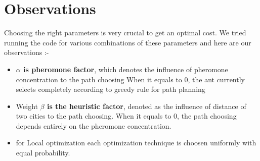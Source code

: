 \documentclass[11pt,a4paper]{article}
\begin{document}
\section{Observations}
Choosing the right parameters is very crucial to get an optimal cost.
We tried running the code for various combinations of these parameters and 
here are our observations :-
\begin{itemize}
    \item \textbf{$\alpha$ is pheromone factor}, which denotes the influence of 
    pheromone concentration to the path choosing 
    When it equals to 0, 
    the ant currently selects completely according to greedy rule for path planning
    \item Weight \textbf{$\beta$ is the heuristic factor}, denoted 
    as the influence of
    distance of two cities to the path choosing. When it equals to 0, the path choosing 
    depends entirely on the pheromone concentration.
    \item for Local optimization each optimization technique is choosen uniformly with equal probability. 
\end{itemize}
\end{document}
